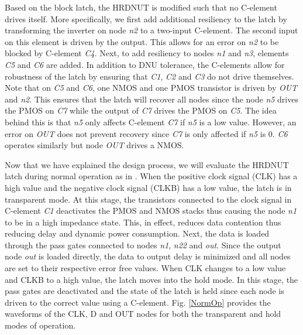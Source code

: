 Based on the block latch, the HRDNUT is modified such that no C-element drives itself. More specifically, we first add additional resiliency to the latch by transforming the inverter on node \textit{n2} to a two-input C-element. The second input on this element is driven by the output. This allows for an error on \textit{n2} to be blocked by C-element \textit{C4}. Next, to add resiliency to nodes \textit{n1} and \textit{n3}, elements \textit{C5} and \textit{C6} are added. In addition to DNU tolerance, the C-elements allow for robustness of the latch by ensuring that \textit{C1}, \textit{C2} and \textit{C3} do not drive themselves. Note that on \textit{C5} and \textit{C6}, one NMOS and one PMOS transistor is driven by \textit{OUT} and \textit{n2}. This ensures that the latch will recover all nodes since the node \textit{n5} drives the PMOS on \textit{C7} while the output of \textit{C7} drives the PMOS  on \textit{C5}. The idea behind this is that \textit{n5} only affects C-element \textit{C7} if \textit{n5} is a low value. However, an error on \textit{OUT} does not prevent recovery since \textit{C7} is only affected if \textit{n5} is 0. \textit{C6} operates similarly but node \textit{OUT} drives a NMOS.

Now that we have explained the design process, we will evaluate the HRDNUT latch during normal operation as in \cite{Watkins2016}. When the positive clock signal (CLK) has a high value and the negative clock signal (CLKB) has a low value, the latch is in transparent mode. At this stage, the transistors connected to the clock signal in C-element \textit{C1} deactivates the PMOS and NMOS stacks thus causing the node \textit{n1} to be in a high impedance state. This, in effect, reduces data contention thus reducing delay and dynamic power consumption. Next, the data is loaded through the pass gates connected to nodes \textit{n1}, \textit{n22} and \textit{out}. Since the output node \textit{out} is loaded directly, the data to output delay is minimized and all nodes are set to their respective error free values. When CLK changes to a low value and CLKB to a high value, the latch moves into the hold mode. In this stage, the pass gates are deactivated and the state of the latch is held since each node is driven to the correct value using a C-element. Fig. \ref{NormOp} provides the waveforms of the CLK, D and OUT nodes for both the transparent and hold modes of operation.

